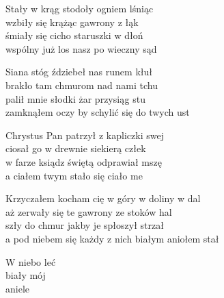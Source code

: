 \begin{text}
    Stały w krąg stodoły ogniem lśniąc\\
    wzbiły się krążąc gawrony z łąk\\
    śmiały się cicho staruszki w dłoń\\
    wspólny już los nasz po wieczny sąd

    Siana stóg ździebeł nas runem kłuł\\
    brakło tam chmurom nad nami tchu\\
    palił mnie słodki żar przysiąg stu\\
    zamknąłem oczy by schylić się do twych ust

    Chrystus Pan patrzył z kapliczki swej\\
    ciosał go w drewnie siekierą człek\\
    w farze ksiądz świętą odprawiał mszę\\
    a ciałem twym stało się ciało me

    Krzyczałem kocham cię w góry w doliny w dal\\
    aż zerwały się te gawrony ze stoków hal\\
    szły do chmur jakby je spłoszył strzał\\
    a pod niebem się każdy z nich białym aniołem stał

    W niebo leć\\
    biały mój\\
    aniele
\end{text}
\begin{chord}

\end{chord}